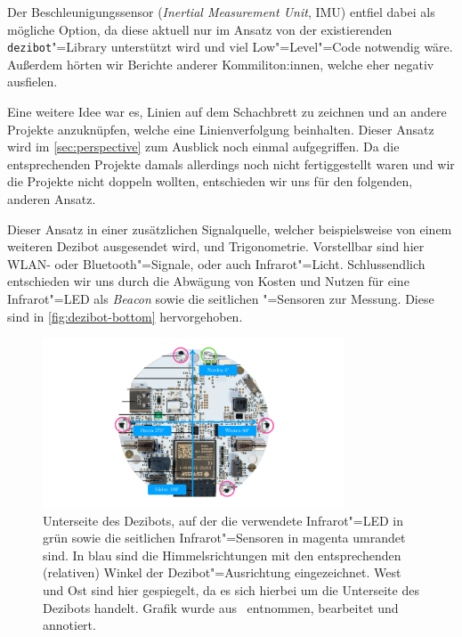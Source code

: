 Der Beschleunigungssensor (\emph{Inertial Measurement Unit}, IMU) entfiel dabei als mögliche Option, da diese aktuell nur im Ansatz von der existierenden \texttt{dezibot}"=Library unterstützt wird und viel Low"=Level"=Code notwendig wäre. Außerdem hörten wir Berichte anderer Kommiliton:innen, welche eher negativ ausfielen.

Eine weitere Idee war es, Linien auf dem Schachbrett zu zeichnen und an andere Projekte anzuknüpfen, welche eine Linienverfolgung beinhalten. Dieser Ansatz wird im \autoref{sec:perspective} zum Ausblick noch einmal aufgegriffen. Da die entsprechenden Projekte damals allerdings noch nicht fertiggestellt waren und wir die Projekte nicht doppeln wollten, entschieden wir uns für den folgenden, anderen Ansatz.

Dieser Ansatz in einer zusätzlichen Signalquelle, welcher beispielsweise von einem weiteren Dezibot ausgesendet wird, und Trigonometrie. Vorstellbar sind hier WLAN- oder Bluetooth"=Signale, oder auch Infrarot"=Licht. Schlussendlich entschieden wir uns durch die Abwägung von Kosten und Nutzen für eine Infrarot"=LED als \emph{Beacon} sowie die seitlichen "=Sensoren zur Messung. Diese sind in \autoref{fig:dezibot-bottom} hervorgehoben.

\begin{figure}[h]
    \centering
    \includegraphics[width=0.8\textwidth]{../assets/dezibot_bottom.pdf}
    \caption{Unterseite des Dezibots, auf der die verwendete Infrarot"=LED in grün sowie die seitlichen Infrarot"=Sensoren in magenta umrandet sind. In blau sind die Himmelsrichtungen mit den entsprechenden (relativen) Winkel der Dezibot"=Ausrichtung eingezeichnet. West und Ost sind hier gespiegelt, da es sich hierbei um die Unterseite des Dezibots handelt. Grafik wurde aus~\cite{fingerleDokumentationDezibot42025} entnommen, bearbeitet und annotiert.}
    \label{fig:dezibot-bottom}
\end{figure}

